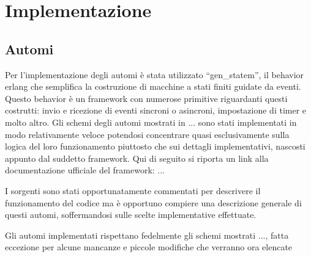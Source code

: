 
\chapter{Implementazione}

\section{Automi} \label{implementazioneAutomi}
Per l'implementazione degli automi è stata utilizzato ``gen\_statem'', il behavior erlang che semplifica la costruzione di macchine a stati finiti guidate da eventi. Questo behavior è un framework con numerose primitive riguardanti questi costrutti: invio e ricezione di eventi sincroni o asincroni, impostazione di timer e molto altro. Gli schemi degli automi mostrati in ... sono stati implementati in modo relativamente veloce potendosi concentrare quasi esclusivamente sulla logica del loro funzionamento piuttosto che sui dettagli implementativi, nascosti appunto dal suddetto framework. 
Qui di seguito si riporta un link alla documentazione ufficiale del framework: ...

I sorgenti sono stati opportunatamente commentati per descrivere il funzionamento del codice ma è opportuno compiere una descrizione generale di questi automi, soffermandosi sulle scelte implementative effettuate.

Gli automi implementati rispettano fedelmente gli schemi mostrati ..., fatta eccezione per alcune mancanze e piccole modifiche che verranno ora elencate

